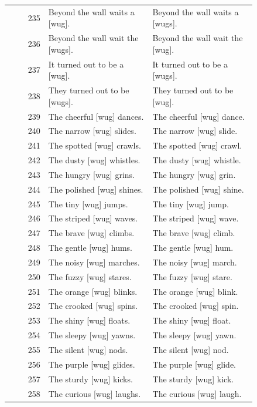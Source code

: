 \begin{longtable}{@{}rp{0.42\linewidth}p{0.42\linewidth}@{}}
235 & Beyond the wall waits a {[}wug{]}. & Beyond the wall waits a {[}wugs{]}. \\
236 & Beyond the wall wait the {[}wugs{]}. & Beyond the wall wait the {[}wug{]}. \\
237 & It turned out to be a {[}wug{]}. & It turned out to be a {[}wugs{]}. \\
238 & They turned out to be {[}wugs{]}. & They turned out to be {[}wug{]}. \\
239 & The cheerful {[}wug{]} dances. & The cheerful {[}wug{]} dance. \\
240 & The narrow {[}wug{]} slides. & The narrow {[}wug{]} slide. \\
241 & The spotted {[}wug{]} crawls. & The spotted {[}wug{]} crawl. \\
242 & The dusty {[}wug{]} whistles. & The dusty {[}wug{]} whistle. \\
243 & The hungry {[}wug{]} grins. & The hungry {[}wug{]} grin. \\
244 & The polished {[}wug{]} shines. & The polished {[}wug{]} shine. \\
245 & The tiny {[}wug{]} jumps. & The tiny {[}wug{]} jump. \\
246 & The striped {[}wug{]} waves. & The striped {[}wug{]} wave. \\
247 & The brave {[}wug{]} climbs. & The brave {[}wug{]} climb. \\
248 & The gentle {[}wug{]} hums. & The gentle {[}wug{]} hum. \\
249 & The noisy {[}wug{]} marches. & The noisy {[}wug{]} march. \\
250 & The fuzzy {[}wug{]} stares. & The fuzzy {[}wug{]} stare. \\
251 & The orange {[}wug{]} blinks. & The orange {[}wug{]} blink. \\
252 & The crooked {[}wug{]} spins. & The crooked {[}wug{]} spin. \\
253 & The shiny {[}wug{]} floats. & The shiny {[}wug{]} float. \\
254 & The sleepy {[}wug{]} yawns. & The sleepy {[}wug{]} yawn. \\
255 & The silent {[}wug{]} nods. & The silent {[}wug{]} nod. \\
256 & The purple {[}wug{]} glides. & The purple {[}wug{]} glide. \\
257 & The sturdy {[}wug{]} kicks. & The sturdy {[}wug{]} kick. \\
258 & The curious {[}wug{]} laughs. & The curious {[}wug{]} laugh. \\

\end{longtable}
